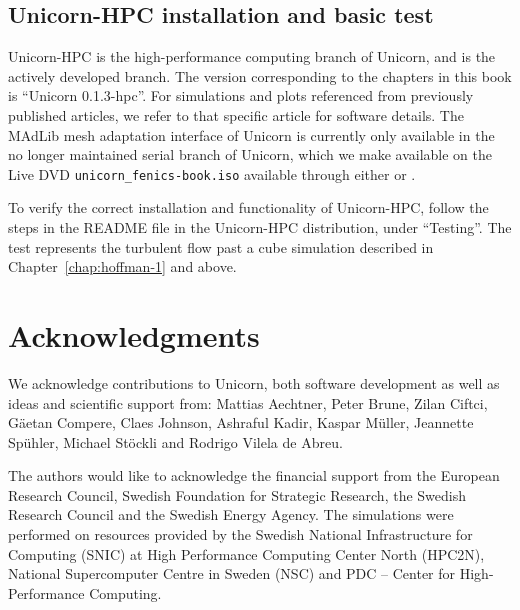 \subsection{Unicorn-HPC installation and basic test}

Unicorn-HPC is the high-performance computing branch of Unicorn, and
is the actively developed branch. The version corresponding to the
chapters in this book is ``Unicorn 0.1.3-hpc''. For simulations and
plots referenced from previously published articles, we refer to that
specific article for software details. The MAdLib mesh adaptation
interface of Unicorn is currently only available in the no longer
maintained serial branch of Unicorn, which we make available on the
Live DVD {\tt unicorn\_fenics-book.iso} available through
either 
or .

To verify the correct installation and functionality of Unicorn-HPC,
follow the steps in the README file in the Unicorn-HPC distribution,
under ``Testing''. The test represents the turbulent flow past a cube
simulation described in Chapter~\ref{chap:hoffman-1} and above.

\section{Acknowledgments}

We acknowledge contributions to Unicorn, both software development as
well as ideas and scientific support from: Mattias Aechtner, Peter
Brune, Zilan Ciftci, G\"aetan Compere, Claes Johnson, Ashraful Kadir,
Kaspar M\"uller, Jeannette Sp\"uhler, Michael St\"ockli and Rodrigo
Vilela de Abreu.

The authors would like to acknowledge the financial support from the
European Research Council, Swedish Foundation for Strategic Research,
the Swedish Research Council and the Swedish Energy Agency. The
simulations were performed on resources provided by the Swedish
National Infrastructure for Computing (SNIC) at High Performance
Computing Center North (HPC2N), National Supercomputer Centre in
Sweden (NSC) and PDC -- Center for High-Performance Computing.
